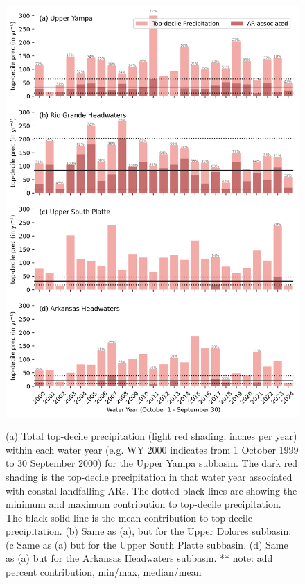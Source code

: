 \documentclass[draft]{agujournal2019}
\begin{document}
\begin{figure}
\noindent\includegraphics[width=\textwidth]{fig4.png}
\label{fig:time_series}
\caption{(a) Total top-decile precipitation (light red shading; inches per year) within each water year (e.g. WY 2000 indicates from 1 October 1999 to 30 September 2000) for the Upper Yampa subbasin. The dark red shading is the top-decile precipitation in that water year associated with coastal landfalling ARs. The dotted black lines are showing the minimum and maximum contribution to top-decile precipitation. The black solid line is the mean contribution to top-decile precipitation. (b) Same as (a), but for the Upper Dolores subbasin. (c Same as (a) but for the Upper South Platte subbasin. (d) Same as (a) but for the Arkansas Headwaters subbasin. ** note: add percent contribution, min/max, median/mean}
\end{figure}
\end{document}
